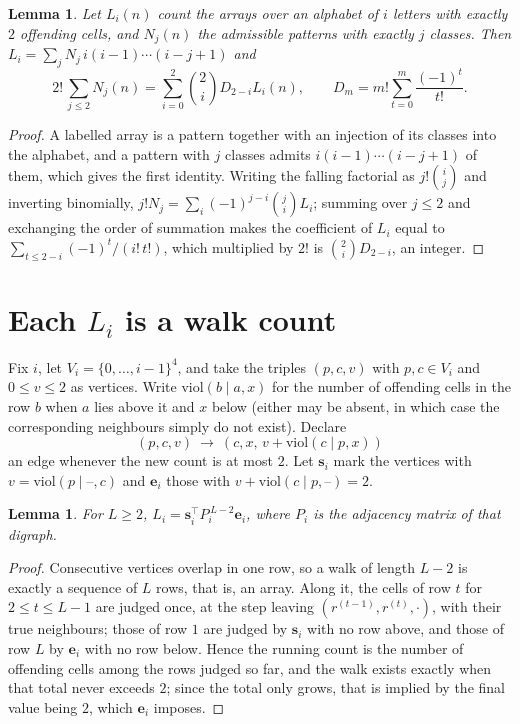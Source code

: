 \documentclass[11pt,a4paper]{article}
\theoremstyle{plain}
\newtheorem{lemma}[theorem]{Lemma}
\theoremstyle{definition}
\begin{document}
\begin{lemma}\label{lem:inv}
Let $L_i(n)$ count the arrays over an alphabet of $i$ letters with exactly $2$ offending
cells, and $N_j(n)$ the admissible patterns with exactly $j$ classes. Then
$L_i=\sum_j N_j\,i(i-1)\cdots(i-j+1)$ and
\[
2!\,\sum_{j\le2}N_j(n)=\sum_{i=0}^{2}\binom{2}{i}D_{2-i}L_i(n),
\qquad D_m=m!\sum_{t=0}^{m}\frac{(-1)^t}{t!} .
\]
\end{lemma}

\begin{proof}
A labelled array is a pattern together with an injection of its classes into the alphabet,
and a pattern with $j$ classes admits $i(i-1)\cdots(i-j+1)$ of them, which gives the first
identity. Writing the falling factorial as $j!\binom{i}{j}$ and inverting binomially,
$j!N_j=\sum_i(-1)^{j-i}\binom{j}{i}L_i$; summing over $j\le2$ and exchanging the
order of summation makes the coefficient of $L_i$ equal to
$\sum_{t\le2-i}(-1)^t/(i!\,t!)$, which multiplied by $2!$ is
$\binom{2}{i}D_{2-i}$, an integer.
\end{proof}

\section{Each $L_i$ is a walk count}

Fix $i$, let $V_i=\{0,\dots,i-1\}^{4}$, and take the triples $(p,c,v)$ with
$p,c\in V_i$ and $0\le v\le2$ as vertices. Write $\mathrm{viol}(b\mid a,x)$ for the number
of offending cells in the row $b$ when $a$ lies above it and $x$ below (either may be
absent, in which case the corresponding neighbours simply do not exist). Declare
\[
(p,c,v)\ \longrightarrow\ (c,x,\,v+\mathrm{viol}(c\mid p,x))
\]
an edge whenever the new count is at most $2$. Let $\mathbf{s}_i$ mark the vertices with
$v=\mathrm{viol}(p\mid\text{--},c)$ and $\mathbf{e}_i$ those with
$v+\mathrm{viol}(c\mid p,\text{--})=2$.

\begin{lemma}\label{lem:walk}
For $L\ge2$, $L_i=\mathbf{s}_i^{\!\top}P_i^{\,L-2}\mathbf{e}_i$, where $P_i$ is the
adjacency matrix of that digraph.
\end{lemma}

\begin{proof}
Consecutive vertices overlap in one row, so a walk of length $L-2$ is exactly a sequence
of $L$ rows, that is, an array. Along it, the cells of row $t$ for $2\le t\le L-1$ are
judged once, at the step leaving $(r^{(t-1)},r^{(t)},\cdot)$, with their true neighbours;
those of row $1$ are judged by $\mathbf{s}_i$ with no row above, and those of row
$L$ by $\mathbf{e}_i$ with no row below. Hence the running count is the number of
offending cells among the rows judged so far, and the walk exists exactly when that total
never exceeds $2$; since the total only grows, that is implied by the final value being
$2$, which $\mathbf{e}_i$ imposes.
\end{proof}
\end{document}
